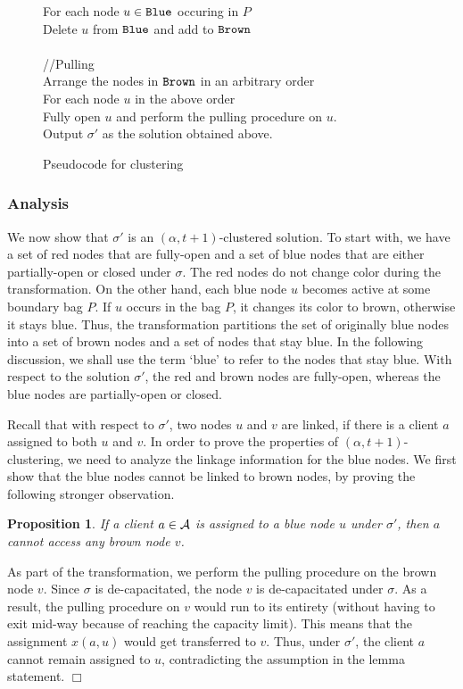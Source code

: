 \documentclass[11pt]{article}
\newtheorem{proposition}{Proposition}[section]
\newcommand{\mypara}[1] {\subsubsection*{#1}}
\newcommand{\calA} {{\cal A}}
\newcommand{\myblue} {{\tt Blue}}
\newcommand{\mybrown} {{\tt Brown}}
\newcommand{\qed} {\hfill$\Box$}
\begin{document}
\begin{figure}
\begin{center}
\begin{boxedminipage}{0.8\hsize}
\begin{tabbing}
\> \> \> For each node $u\in \myblue$ occuring in $P$\\
\> \> \> \> Delete $u$ from $\myblue$ and add to $\mybrown$\\
\>\\
\>//Pulling \\
\> Arrange the nodes in $\mybrown$ in an arbitrary order\\
\> For each node $u$ in the above order\\
\> \> Fully open $u$ and perform the pulling procedure on $u$.\\
\> Output $\sigma'$ as the solution obtained above.\\
\end{tabbing}
\end{boxedminipage}
\end{center}
\caption{Pseudocode for clustering}
\label{fig:clustering-pseudo}
\end{figure}

\mypara{\bf Analysis}
We now show that $\sigma'$ is an $(\alpha, t+1)$-clustered solution. 
To start with, we have a set of red nodes that are fully-open and 
a set of blue nodes that are either partially-open or closed under $\sigma$.
The red nodes do not change color during the transformation.
On the other hand, each blue node $u$ becomes active at some boundary bag $P$.
If $u$ occurs in the bag $P$, it changes its color to brown, otherwise it stays blue.
Thus, the transformation partitions the set of originally blue nodes into a set of brown nodes and a set of nodes that stay blue.
In the following discussion, we shall use the term `blue' to refer to the nodes that stay blue.
With respect to the solution $\sigma'$, the red and brown nodes are fully-open, whereas 
the blue nodes are partially-open or closed. 

Recall that with respect to $\sigma'$, two nodes $u$ and $v$ are linked, if there is a client $a$ assigned to both $u$ and $v$.
In order to prove the properties of $(\alpha, t+1)$-clustering, we need to analyze the linkage information for the blue nodes. 
We first show that the blue nodes cannot be linked to brown nodes, by proving the following stronger observation. 

\begin{proposition}
\label{prop:swallow}
If a client $a\in \calA$ is assigned to a blue node $u$ under $\sigma'$, then $a$ cannot access any brown node $v$.
\end{proposition}
\proof
As part of the transformation, we perform the pulling procedure on the brown node $v$.
Since $\sigma$ is de-capacitated, the node $v$ is de-capacitated under $\sigma$.
As a result, the pulling procedure on $v$ would run to its entirety (without having to exit mid-way because of 
reaching the capacity limit). This means that the assignment $x(a, u)$ would get transferred to $v$.
Thus, under $\sigma'$, the client $a$ cannot remain assigned to $u$, contradicting the assumption in the lemma statement.
\qed
\end{document}
